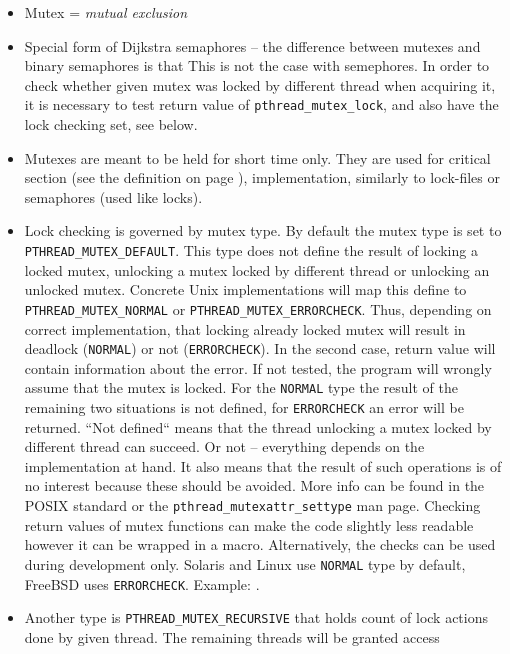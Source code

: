 \begin{itemize}
\item Mutex = \emph{mutual exclusion}
\item Special form of Dijkstra semaphores -- the difference between mutexes and
binary semaphores is that  This is not the case with
semephores. In order to check whether given mutex was locked by different thread
when acquiring it, it is necessary to test return value of
\texttt{p\-thread\_mutex\_lock}, and also have the lock checking set, see below.
\item Mutexes are meant to be held for short time only. They are used for
critical section (see the definition on page \pageref{CRITICALSECTION}),
implementation, similarly to lock-files or semaphores (used like locks).
\item Lock checking is governed by mutex type. By default the mutex type is set to
\texttt{PTHREAD\_MUTEX\_DEF\-AULT}. This type does not define the result of
locking a locked mutex, unlocking a mutex locked by different thread or
unlocking an unlocked mutex. Concrete Unix implementations will map this define
to \texttt{PTHREAD\_MUTEX\_NORMAL} or \texttt{PTHREAD\_\-MUT\-EX\_ERRORCHECK}.
Thus, depending on correct implementation, that locking already locked mutex
will result in deadlock (\texttt{NORMAL}) or not (\texttt{ERRORCHECK}).
In the second case, return value will contain information about the error.
If not tested, the program will wrongly assume that the mutex is locked.
For the \texttt{NORMAL} type the result of the remaining two situations is not
defined, for \texttt{ERRORCHECK} an error will be returned. ``Not defined``
means that the thread unlocking a mutex locked by different thread can succeed.
Or not -- everything depends on the implementation at hand. It also means that
the result of such operations is of no interest because these should be avoided.
More info can be found in the POSIX standard or the
\texttt{pth\-read\_mutex\-attr\_set\-ty\-pe} man page.
Checking return values of mutex functions can make the code slightly less
readable however it can be wrapped in a macro. Alternatively, the checks can be
used during development only.
Solaris and Linux use \texttt{NORMAL} type by default, FreeBSD uses
\texttt{ERRORCHECK}.
\label{NOTMYLOCK}
Example: .
\item Another type is \texttt{PTHREAD\_MUTEX\_RECURSIVE} that holds count of
lock actions done by given thread. The remaining threads will be granted access

\end{itemize}
